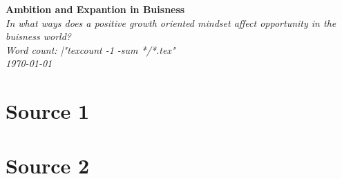 \documentclass[letterpaper, 12pt]{article}
\author{Grant Lemons}
\date{\today}
\newcommand{\thetitle}{Ambition and Expantion in Buisness}
\newcommand{\researchquestion}{In what ways does a positive growth oriented mindset affect opportunity in the buisness world?}
\newcommand{\wordcount}{|"texcount -1 -sum */*.tex"}
\begin{document}
\begin{titlepage}
\begin{center}
\vspace*{6.3cm}
\textbf{\Huge \thetitle}\\
\textit{\researchquestion}\\
\vspace{2.5cm}
\textit{Word count: \wordcount}\\
\vspace{0.6cm}
\textit{\today}\\

\end{center}
\end{titlepage}


\newpage

\section{Source 1}


\section{Source 2}

\end{document}
